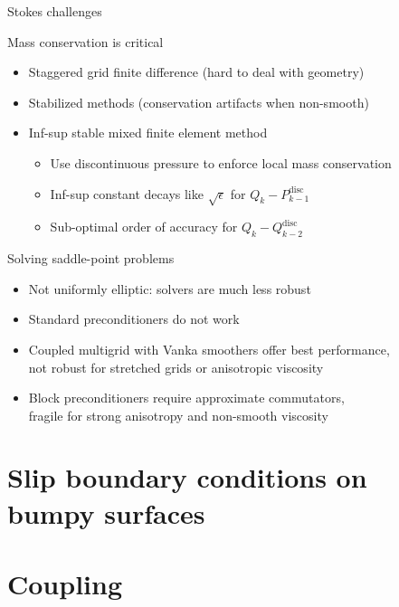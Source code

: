 \documentclass{beamer}
\begin{document}


\begin{frame}{Stokes challenges}
  \begin{block}{Mass conservation is critical}
    \begin{itemize}
    \item Staggered grid finite difference (hard to deal with geometry)
    \item Stabilized methods (conservation artifacts when non-smooth)
    \item Inf-sup stable mixed finite element method
      \begin{itemize}
      \item Use discontinuous pressure to enforce local mass conservation
      \item Inf-sup constant decays like $\sqrt{\epsilon}$ for $Q_k-P_{k-1}^{\text{disc}}$
      \item Sub-optimal order of accuracy for $Q_k-Q_{k-2}^{\text{disc}}$
      \end{itemize}
    \end{itemize}      
  \end{block}
  \begin{block}{Solving saddle-point problems}
    \begin{itemize}
    \item Not uniformly elliptic: solvers are much less robust
    \item Standard preconditioners do not work
    \item Coupled multigrid with Vanka smoothers offer best performance,\\
      \quad not robust for stretched grids or anisotropic viscosity
    \item Block preconditioners require approximate commutators, \\
      \quad fragile for strong anisotropy and non-smooth viscosity
    \end{itemize}
  \end{block}
\end{frame}

\section[Slip]{Slip boundary conditions on bumpy surfaces}




\section{Coupling}

\end{document}
